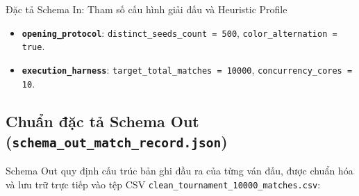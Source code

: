 \documentclass[11pt,a4paper]{article}
\begin{document}
\begin{codebox}{Đặc tả Schema In: Tham số cấu hình giải đấu và Heuristic Profile}
\begin{itemize}
\begin{itemize}
        \item \texttt{center\_gamma} (\texttt{integer}): Trọng số kiểm soát trung tâm Chebyshev.
        \item \texttt{detect\_gapped} (\texttt{boolean}): Cờ bật/tắt nhận diện thế cờ tách lẻ.
        \item \texttt{verify\_span} (\texttt{boolean}): Cờ bật/tắt kiểm tra không gian khả dụng $\ge 5$.
    \end{itemize}
    \item \textbf{\texttt{opening\_protocol}}: \texttt{distinct\_seeds\_count = 500}, \texttt{color\_alternation = true}.
    \item \textbf{\texttt{execution\_harness}}: \texttt{target\_total\_matches = 10000}, \texttt{concurrency\_cores = 10}.
\end{itemize}
\end{codebox}

\subsection{Chuẩn đặc tả Schema Out (\texttt{schema\_out\_match\_record.json})}
Schema Out quy định cấu trúc bản ghi đầu ra của từng ván đấu, được chuẩn hóa và lưu trữ trực tiếp vào tệp CSV \texttt{clean\_tournament\_10000\_matches.csv}:
\end{document}
